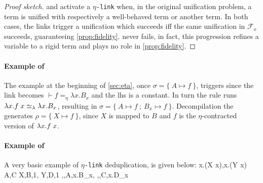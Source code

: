 \documentclass[sigconf,natbib=false,review]{acmart}
\newcommand{\appsep}{\ensuremath{\textcolor{lightgray}{\cdot}}}
\newcommand{\UnifRel}{\ensuremath{\simeq}}
\newcommand{\Ue}{\ensuremath{\UnifRel_\lambda}\xspace}
\newcommand{\linkMacro}[1]{\ensuremath{#1}\texttt{-link}\xspace}
\newcommand{\linketa} {\linkMacro{\eta}}
\newcommand{\Fo}{\texorpdfstring{\ensuremath{\mathcal{F}_{\!o}\xspace}}{Fo}} %
\newcommand{\linketaM}[3]{\ensuremath{#1 \vdash #2 =_\eta #3}}
\newcommand{\lhs}{lhs\xspace}
\begin{document}
\begin{proof}[Proof sketch]
  \progressetaleft and \progressetadedup activate a \linketa when, in the
  original unification problem, a \maybeeta term is unified with respectively a
  well-behaved term or another \maybeeta term. In both cases, the links trigger
  a unification which succeeds iff the same unification in \Fo{} succeeds,
  guaranteeing \cref{prop:fidelity}. \progressetaright never fails, in fact,
  this progression refines a variable to a rigid term and plays no role in 
  \cref{prop:fidelity}.
\end{proof}

\paragraph{Example of \progressetaleft}

The example at the beginning of \cref{sec:eta}, once
$\sigma = \{~ A \mapsto f ~\}$, triggers \progressetaleft since the link
becomes \linketaM{}{f}{\lambda x.B_{x}} and the \lhs is a constant.
In turn the rule runs $\lambda x.f \appsep x \Ue{} \lambda x.B_{x}$,
resulting in $\sigma = \{~ A \mapsto f ~;~ B_{x} \mapsto f ~\}$.
Decompilation the generates $\rho = \{~ X \mapsto f ~\}$, since
$X$ is mapped to $B$ and
$f$ is the $\eta$-contracted version of $\lambda x.f \appsep x$.

\paragraph{Example of \progressetadedup}

A very basic example of \linketa deduplication, is given below:
\printAlll
  {{{\lambda x.(X\appsep x),\lambda x.(Y\appsep x)}}}
  {{{A,C}}}
  {{{X,B,1},
    {Y,D,1}}}
  {{{\eta,,A,\lambda x.B_{x}},
    {\eta,,C,\lambda x.D_{x}}}}
\end{document}
